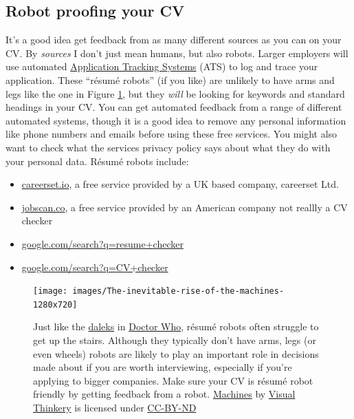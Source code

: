 \documentclass[
]{book}
\providecommand{\tightlist}{%
  \setlength{\itemsep}{0pt}\setlength{\parskip}{0pt}}
\begin{document}
\hypertarget{robotproof}{%
\subsection{Robot proofing your CV}\label{robotproof}}

It's a good idea get feedback from as many different sources as you can on your CV. By \emph{sources} I don't just mean humans, but also robots. Larger employers will use automated \href{https://en.wikipedia.org/wiki/Applicant_tracking_system}{Application Tracking Systems} (ATS) to log and trace your application. These ``résumé robots'' (if you like) are unlikely to have arms and legs like the one in Figure \ref{fig:machines-fig}, but they \emph{will} be looking for keywords and standard headings in your CV. You can get automated feedback from a range of different automated systems, though it is a good idea to remove any personal information like phone numbers and emails before using these free services. You might also want to check what the services privacy policy says about what they do with your personal data. Résumé robots include:

\begin{itemize}
\tightlist
\item
  \href{https://careerset.io}{careerset.io}, a free service provided by a UK based company, careerset Ltd.
\item
  \href{https://www.jobscan.co}{jobscan.co}, a free service provided by an American company not reallly a CV checker
\item
  \href{https://www.google.com/search?q=resume+checker}{google.com/search?q=resume+checker}
\item
  \href{https://www.google.com/search?q=cv+checker}{google.com/search?q=CV+checker}
\end{itemize}

\begin{figure}

{\centering \texttt{[image: images/The-inevitable-rise-of-the-machines-1280x720]} 

}

\caption{Just like the \href{https://en.wikipedia.org/wiki/Dalek}{daleks} in \href{https://en.wikipedia.org/wiki/Doctor_Who}{Doctor Who}, résumé robots often struggle to get up the stairs. Although they typically don't have arms, legs (or even wheels) robots are likely to play an important role in decisions made about if you are worth interviewing, especially if you're applying to bigger companies. Make sure your CV is résumé robot friendly by getting feedback from a robot. \href{https://bryanmmathers.com/machines/}{Machines} by \href{https://visualthinkery.com/}{Visual Thinkery} is licensed under \href{https://creativecommons.org/licenses/by-nd/4.0/}{CC-BY-ND}}\label{fig:machines-fig}
\end{figure}
\end{document}

